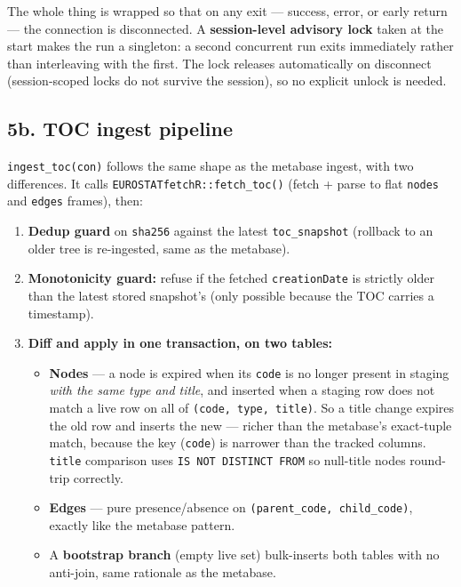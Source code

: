 \documentclass[
]{article}
\providecommand{\tightlist}{%
  \setlength{\itemsep}{0pt}\setlength{\parskip}{0pt}}
\begin{document}
The whole thing is wrapped so that on any exit --- success, error, or
early return --- the connection is disconnected. A \textbf{session-level
advisory lock} taken at the start makes the run a singleton: a second
concurrent run exits immediately rather than interleaving with the
first. The lock releases automatically on disconnect (session-scoped
locks do not survive the session), so no explicit unlock is needed.

\subsection{5b. TOC ingest pipeline}\label{b.-toc-ingest-pipeline}

\texttt{ingest\_toc(con)} follows the same shape as the metabase ingest,
with two differences. It calls \texttt{EUROSTATfetchR::fetch\_toc()}
(fetch + parse to flat \texttt{nodes} and \texttt{edges} frames), then:

\begin{enumerate}
\def\labelenumi{\arabic{enumi}.}
\tightlist
\item
  \textbf{Dedup guard} on \texttt{sha256} against the latest
  \texttt{toc\_snapshot} (rollback to an older tree is re-ingested, same
  as the metabase).
\item
  \textbf{Monotonicity guard:} refuse if the fetched
  \texttt{creationDate} is strictly older than the latest stored
  snapshot's (only possible because the TOC carries a timestamp).
\item
  \textbf{Diff and apply in one transaction, on two tables:}

  \begin{itemize}
  \tightlist
  \item
    \textbf{Nodes} --- a node is expired when its \texttt{code} is no
    longer present in staging \emph{with the same type and title}, and
    inserted when a staging row does not match a live row on all of
    \texttt{(code,\ type,\ title)}. So a title change expires the old
    row and inserts the new --- richer than the metabase's exact-tuple
    match, because the key (\texttt{code}) is narrower than the tracked
    columns. \texttt{title} comparison uses
    \texttt{IS\ NOT\ DISTINCT\ FROM} so null-title nodes round-trip
    correctly.
  \item
    \textbf{Edges} --- pure presence/absence on
    \texttt{(parent\_code,\ child\_code)}, exactly like the metabase
    pattern.
  \item
    A \textbf{bootstrap branch} (empty live set) bulk-inserts both
    tables with no anti-join, same rationale as the metabase.
  \end{itemize}
\end{enumerate}
\end{document}
